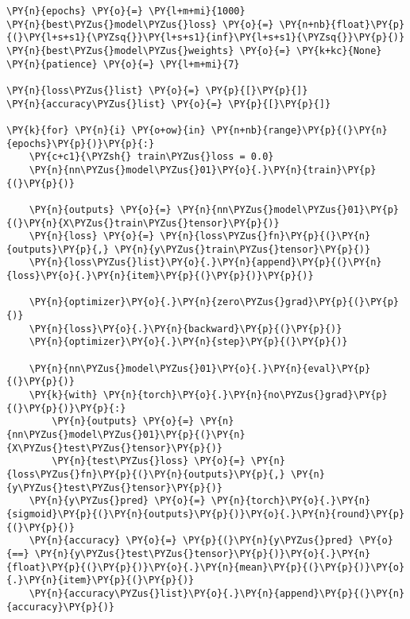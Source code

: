     \begin{tcolorbox}[breakable, size=fbox, boxrule=1pt, pad at break*=1mm,colback=cellbackground, colframe=cellborder]
\begin{Verbatim}[commandchars=\\\{\}]
\PY{n}{epochs} \PY{o}{=} \PY{l+m+mi}{1000}
\PY{n}{best\PYZus{}model\PYZus{}loss} \PY{o}{=} \PY{n+nb}{float}\PY{p}{(}\PY{l+s+s1}{\PYZsq{}}\PY{l+s+s1}{inf}\PY{l+s+s1}{\PYZsq{}}\PY{p}{)}
\PY{n}{best\PYZus{}model\PYZus{}weights} \PY{o}{=} \PY{k+kc}{None}
\PY{n}{patience} \PY{o}{=} \PY{l+m+mi}{7}

\PY{n}{loss\PYZus{}list} \PY{o}{=} \PY{p}{[}\PY{p}{]}
\PY{n}{accuracy\PYZus{}list} \PY{o}{=} \PY{p}{[}\PY{p}{]}

\PY{k}{for} \PY{n}{i} \PY{o+ow}{in} \PY{n+nb}{range}\PY{p}{(}\PY{n}{epochs}\PY{p}{)}\PY{p}{:}
    \PY{c+c1}{\PYZsh{} train\PYZus{}loss = 0.0}
    \PY{n}{nn\PYZus{}model\PYZus{}01}\PY{o}{.}\PY{n}{train}\PY{p}{(}\PY{p}{)}

    \PY{n}{outputs} \PY{o}{=} \PY{n}{nn\PYZus{}model\PYZus{}01}\PY{p}{(}\PY{n}{X\PYZus{}train\PYZus{}tensor}\PY{p}{)}
    \PY{n}{loss} \PY{o}{=} \PY{n}{loss\PYZus{}fn}\PY{p}{(}\PY{n}{outputs}\PY{p}{,} \PY{n}{y\PYZus{}train\PYZus{}tensor}\PY{p}{)}
    \PY{n}{loss\PYZus{}list}\PY{o}{.}\PY{n}{append}\PY{p}{(}\PY{n}{loss}\PY{o}{.}\PY{n}{item}\PY{p}{(}\PY{p}{)}\PY{p}{)}

    \PY{n}{optimizer}\PY{o}{.}\PY{n}{zero\PYZus{}grad}\PY{p}{(}\PY{p}{)}
    \PY{n}{loss}\PY{o}{.}\PY{n}{backward}\PY{p}{(}\PY{p}{)}
    \PY{n}{optimizer}\PY{o}{.}\PY{n}{step}\PY{p}{(}\PY{p}{)}

    \PY{n}{nn\PYZus{}model\PYZus{}01}\PY{o}{.}\PY{n}{eval}\PY{p}{(}\PY{p}{)}
    \PY{k}{with} \PY{n}{torch}\PY{o}{.}\PY{n}{no\PYZus{}grad}\PY{p}{(}\PY{p}{)}\PY{p}{:}
        \PY{n}{outputs} \PY{o}{=} \PY{n}{nn\PYZus{}model\PYZus{}01}\PY{p}{(}\PY{n}{X\PYZus{}test\PYZus{}tensor}\PY{p}{)}
        \PY{n}{test\PYZus{}loss} \PY{o}{=} \PY{n}{loss\PYZus{}fn}\PY{p}{(}\PY{n}{outputs}\PY{p}{,} \PY{n}{y\PYZus{}test\PYZus{}tensor}\PY{p}{)}
    \PY{n}{y\PYZus{}pred} \PY{o}{=} \PY{n}{torch}\PY{o}{.}\PY{n}{sigmoid}\PY{p}{(}\PY{n}{outputs}\PY{p}{)}\PY{o}{.}\PY{n}{round}\PY{p}{(}\PY{p}{)}
    \PY{n}{accuracy} \PY{o}{=} \PY{p}{(}\PY{n}{y\PYZus{}pred} \PY{o}{==} \PY{n}{y\PYZus{}test\PYZus{}tensor}\PY{p}{)}\PY{o}{.}\PY{n}{float}\PY{p}{(}\PY{p}{)}\PY{o}{.}\PY{n}{mean}\PY{p}{(}\PY{p}{)}\PY{o}{.}\PY{n}{item}\PY{p}{(}\PY{p}{)}
    \PY{n}{accuracy\PYZus{}list}\PY{o}{.}\PY{n}{append}\PY{p}{(}\PY{n}{accuracy}\PY{p}{)}


\end{Verbatim}
\end{tcolorbox}
